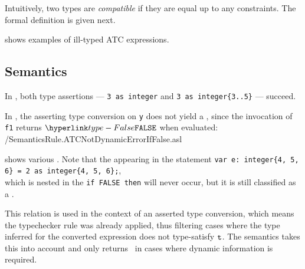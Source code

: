 Intuitively, two types are \emph{compatible} if they are equal up to any constraints.
The formal definition is given next.


 shows examples of ill-typed ATC expressions.


\subsection{Semantics}
In , both type assertions ---
\verb|3 as integer| and \verb|3 as integer{3..5}| --- succeed.


In , the asserting type conversion on \texttt{y}
does not yield a \DynamicErrorConfigurationTerm{}, since the invocation of \texttt{f1} returns $\False$ when
evaluated:
{\semanticstests/SemanticsRule.ATCNotDynamicErrorIfFalse.asl}

 shows various \dynamicerrorsterm{}.
Note that the \dynamicerrorterm{} appearing in the statement
\verb|var e: integer{4, 5, 6} = 2 as integer{4, 5, 6};|, \\
which is nested in the \verb|if FALSE then|
will never occur, but it is still classified as a \dynamicerrorterm{}.



This relation is used in the context of an asserted type conversion,
which means the typechecker rule  was already applied,
thus filtering cases where the type inferred for the converted expression
does not type-satisfy $\texttt{t}$. The semantics takes this into account and
only returns \False\ in cases where dynamic information is required.

